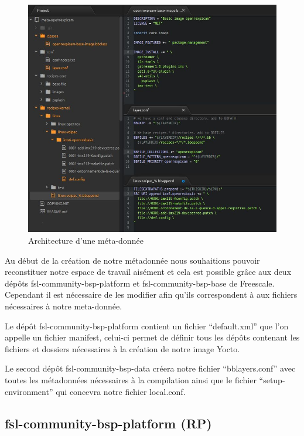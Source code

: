 \begin{figure}[!htb]
    \centering
    \includegraphics[trim={0cm 0cm 0cm 0cm},clip,scale=0.31]{Figures/architecture.png}
    \decoRule
    \caption{Architecture d'une méta-donnée} \label{fig:architecture}
\end{figure} 

Au début de la création de notre métadonnée nous souhaitions pouvoir reconstituer notre
espace de travail aisément et cela est possible grâce aux deux dépôts
fsl-community-bsp-platform et fsl-community-bsp-base de Freescale. Cependant il est
nécessaire de les modifier afin qu’ils correspondent à aux fichiers nécessaires à notre
meta-donnée. \medskip 

Le dépôt fsl-community-bsp-platform contient un fichier “default.xml” que l’on appelle un
fichier manifest, celui-ci permet de définir tous les dépôts contenant les fichiers et dossiers
nécessaires à la création de notre image Yocto. \medskip 

Le second dépôt fsl-community-bsp-data créera notre fichier “bblayers.conf”
avec toutes les métadonnées nécessaires à la compilation ainsi que le fichier
“setup-environment” qui concevra notre fichier local.conf.

\subsection{fsl-community-bsp-platform (RP)}

